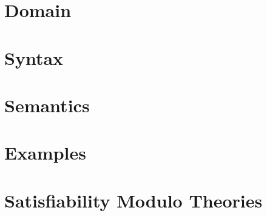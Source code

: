 \documentclass{book}
\begin{document}
\hypertarget{pandoc.profile.debug__pandoc__debug__src__dmt1__lectures__l05_theoryextensions__domain.lean.md}{}
\hypertarget{pandoc.profile.debug__pandoc__debug__src__dmt1__lectures__l05_theoryextensions__domain.lean.md__domain}{%
\section{Domain}\label{pandoc.profile.debug__pandoc__debug__src__dmt1__lectures__l05_theoryextensions__domain.lean.md__domain}}

\hypertarget{pandoc.profile.debug__pandoc__debug__src__dmt1__lectures__l05_theoryextensions__syntax.lean.md}{}
\hypertarget{pandoc.profile.debug__pandoc__debug__src__dmt1__lectures__l05_theoryextensions__syntax.lean.md__syntax}{%
\section{Syntax}\label{pandoc.profile.debug__pandoc__debug__src__dmt1__lectures__l05_theoryextensions__syntax.lean.md__syntax}}

\hypertarget{pandoc.profile.debug__pandoc__debug__src__dmt1__lectures__l05_theoryextensions__semantics.lean.md}{}
\hypertarget{pandoc.profile.debug__pandoc__debug__src__dmt1__lectures__l05_theoryextensions__semantics.lean.md__semantics}{%
\section{Semantics}\label{pandoc.profile.debug__pandoc__debug__src__dmt1__lectures__l05_theoryextensions__semantics.lean.md__semantics}}

\hypertarget{pandoc.profile.debug__pandoc__debug__src__dmt1__lectures__l05_theoryextensions__examples.lean.md}{}
\hypertarget{pandoc.profile.debug__pandoc__debug__src__dmt1__lectures__l05_theoryextensions__examples.lean.md__examples}{%
\section{Examples}\label{pandoc.profile.debug__pandoc__debug__src__dmt1__lectures__l05_theoryextensions__examples.lean.md__examples}}

\hypertarget{pandoc.profile.debug__pandoc__debug__src__smt.md}{}
\hypertarget{pandoc.profile.debug__pandoc__debug__src__smt.md__satisfiability-modulo-theories}{%
\section{Satisfiability Modulo Theories}\label{pandoc.profile.debug__pandoc__debug__src__smt.md__satisfiability-modulo-theories}}
\end{document}
